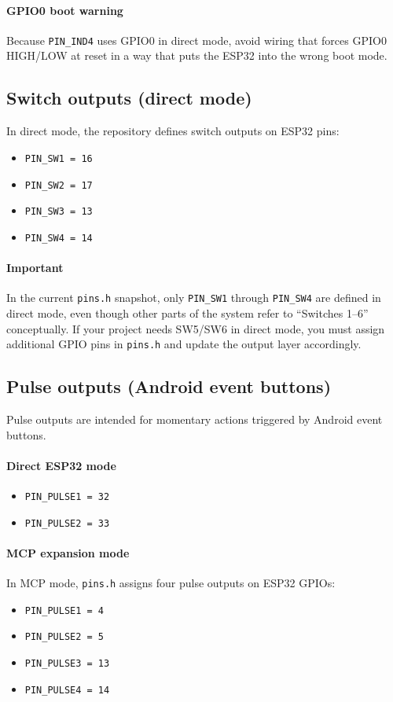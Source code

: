 \paragraph{GPIO0 boot warning}
Because \texttt{PIN\_IND4} uses GPIO0 in direct mode, avoid wiring that forces GPIO0 HIGH/LOW at reset in a way that
puts the ESP32 into the wrong boot mode.

\subsection{Switch outputs (direct mode)}
In direct mode, the repository defines switch outputs on ESP32 pins:

\begin{itemize}
    \item \texttt{PIN\_SW1 = 16}
    \item \texttt{PIN\_SW2 = 17}
    \item \texttt{PIN\_SW3 = 13}
    \item \texttt{PIN\_SW4 = 14}
\end{itemize}

\paragraph{Important}
In the current \texttt{pins.h} snapshot, only \texttt{PIN\_SW1} through \texttt{PIN\_SW4} are defined in direct mode,
even though other parts of the system refer to ``Switches 1--6'' conceptually. If your project needs SW5/SW6 in direct
mode, you must assign additional GPIO pins in \texttt{pins.h} and update the output layer accordingly.

\subsection{Pulse outputs (Android event buttons)}
Pulse outputs are intended for momentary actions triggered by Android event buttons.

\paragraph{Direct ESP32 mode}
\begin{itemize}
    \item \texttt{PIN\_PULSE1 = 32}
    \item \texttt{PIN\_PULSE2 = 33}
\end{itemize}

\paragraph{MCP expansion mode}
In MCP mode, \texttt{pins.h} assigns four pulse outputs on ESP32 GPIOs:
\begin{itemize}
    \item \texttt{PIN\_PULSE1 = 4}
    \item \texttt{PIN\_PULSE2 = 5}
    \item \texttt{PIN\_PULSE3 = 13}
    \item \texttt{PIN\_PULSE4 = 14}
\end{itemize}

